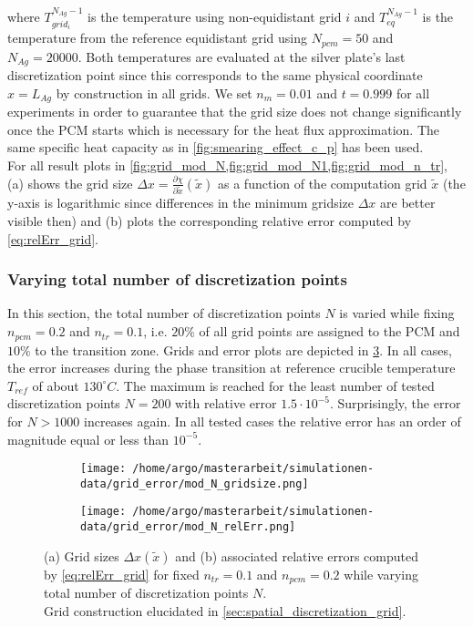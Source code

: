 \documentclass{scrartcl}[12pt, halfparskip]
\numberwithin{equation}{section}
\numberwithin{figure}{section}
\numberwithin{table}{section}
\begin{document}
where $T_{grid_i}^{N_{Ag}-1}$ is the temperature using non-equidistant grid $i$ and $T_{eq}^{N_{Ag}-1}$ is the temperature from the reference equidistant grid using $N_{pcm}=50$ and $N_{Ag}=20000$. Both temperatures are evaluated at the silver plate's last discretization point since this corresponds to the same physical coordinate $x=L_{Ag}$ by construction in all grids. 
We set $n_m=0.01$ and $t=0.999$ for all experiments in order to guarantee that the grid size does not change significantly once the PCM starts which is necessary for the heat flux approximation. The same specific heat capacity as in \cref{fig:smearing_effect_c_p} has been used. \\
For all result plots in \cref{fig:grid_mod_N,fig:grid_mod_N1,fig:grid_mod_n_tr}, (a) shows the grid size $\Delta x = \frac{\partial \chi}{\partial \tilde{x}}(\tilde{x})$ as a function of the computation grid $\tilde{x}$ (the y-axis is logarithmic since differences in the minimum gridsize $\Delta x$ are better visible then) and (b) plots the corresponding relative error computed by \cref{eq:relErr_grid}.

\subsubsection{Varying total number of discretization points}
In this section, the total number of discretization points $N$ is varied while fixing $n_{pcm}=0.2$ and $n_{tr}=0.1$, i.e. $20\%$ of all grid points are assigned to the PCM and $10\%$ to the transition zone. Grids and error plots are depicted in \cref{fig:grid_mod_N}.
In all cases, the error increases during the phase transition at reference crucible temperature $T_{ref}$ of about $130^{\circ} C$. The maximum is reached for the least number of tested discretization points $N=200$ with relative error $1.5 \cdot 10^{-5}$. Surprisingly, the error for $N > 1000$ increases again. In all tested cases the relative error has an order of magnitude equal or less than $10^{-5}$. 


\begin{figure}[H]
	\begin{subfigure}{0.49\textwidth}
		\texttt{[image: /home/argo/masterarbeit/simulationen-data/grid\_error/mod\_N\_gridsize.png]}
		\caption{}
		\label{fig:gridsize_mod_N}
	\end{subfigure}
	\begin{subfigure}{0.49\textwidth}
		\texttt{[image: /home/argo/masterarbeit/simulationen-data/grid\_error/mod\_N\_relErr.png]}
		\caption{}
		\label{fig:grid_relErr_mod_N}
	\end{subfigure}
	\caption{(a) Grid sizes $\Delta x(\tilde{x})$ and (b) associated relative errors computed by \cref{eq:relErr_grid} for fixed $n_{tr}=0.1$ and $n_{pcm}=0.2$ while varying total number of discretization points $N$. \\
	Grid construction elucidated in \cref{sec:spatial_discretization_grid}.}
	\label{fig:grid_mod_N}
\end{figure}
\end{document}
